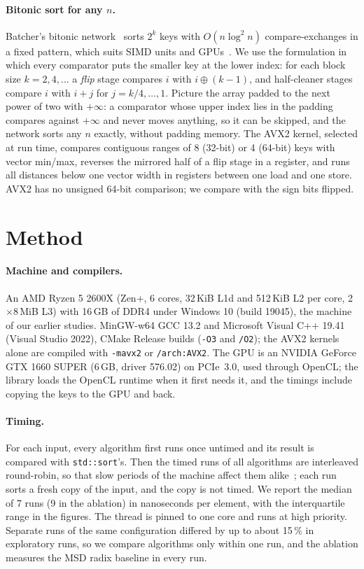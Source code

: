 \documentclass[11pt]{article}
\theoremstyle{definition}
\begin{document}
\paragraph{Bitonic sort for any $n$.} Batcher's bitonic
network~\cite{batcher1968networks} sorts $2^k$ keys with
$O(n \log^2 n)$ compare-exchanges in a fixed pattern, which suits SIMD
units and GPUs~\cite{chhugani2008simd,satish2009gpu}. We use the formulation
in which every comparator puts the smaller key at the lower index: for each
block size $k = 2, 4, \dots$ a \emph{flip} stage compares $i$ with
$i \oplus (k-1)$, and half-cleaner stages compare $i$ with $i + j$ for
$j = k/4, \dots, 1$. Picture the array padded to the next power of two with
$+\infty$: a comparator whose upper index lies in the padding compares
against $+\infty$ and never moves anything, so it can be skipped, and the
network sorts any $n$ exactly, without padding memory. The AVX2 kernel,
selected at run time, compares contiguous ranges of 8 (32-bit) or 4 (64-bit)
keys with vector min/max, reverses the mirrored half of a flip stage in a
register, and runs all distances below one vector width in registers between
one load and one store. AVX2 has no unsigned 64-bit comparison; we compare
with the sign bits flipped.

\section{Method}\label{sec:method}

\paragraph{Machine and compilers.} An AMD Ryzen 5 2600X (Zen+, 6 cores,
32\,KiB L1d and 512\,KiB L2 per core, 2$\times$8\,MiB L3) with 16\,GB of
DDR4 under Windows 10 (build 19045), the machine of our earlier
studies. MinGW-w64 GCC 13.2 and Microsoft Visual C++ 19.41 (Visual
Studio 2022), CMake Release builds (\texttt{-O3} and \texttt{/O2}); the AVX2
kernels alone are compiled with \texttt{-mavx2} or \texttt{/arch:AVX2}. The
GPU is an NVIDIA GeForce GTX 1660 SUPER (6\,GB, driver 576.02) on PCIe~3.0,
used through OpenCL; the library loads the OpenCL runtime when it first needs
it, and the timings include copying the keys to the GPU and back.

\paragraph{Timing.} For each input, every algorithm first runs once
untimed and its result is compared with \texttt{std::sort}'s. Then the timed
runs of all algorithms are interleaved round-robin, so that slow periods of
the machine affect them alike~\cite{mytkowicz2009wrongdata,hoefler2015benchmarking};
each run sorts a fresh copy of the input, and the copy is not timed. We
report the median of 7 runs (9 in the ablation) in nanoseconds per element,
with the interquartile range in the figures. The thread is pinned to one core
and runs at high priority. Separate runs of the same configuration differed
by up to about 15\,\% in exploratory runs, so we compare algorithms only
within one run, and the ablation measures the MSD radix baseline in every
run.
\end{document}
